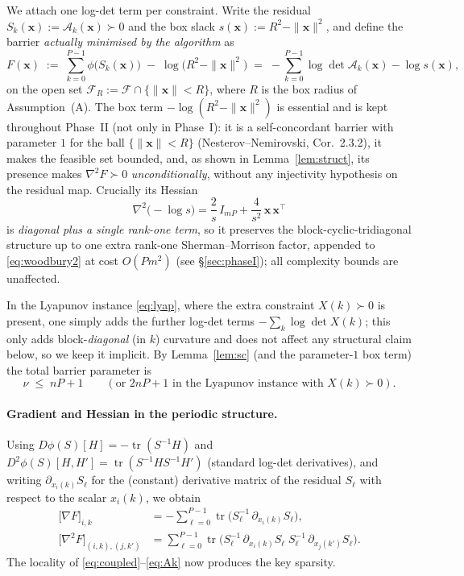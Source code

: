 \documentclass{amsart}
\newcommand{\tr}{\operatorname{tr}}
\begin{document}
We attach one log-det term per constraint. Write the residual
$S_k(\bm x):=\mathcal A_k(\bm x)\succ0$ and the box slack
$s(\bm x):=R^2-\|\bm x\|^2$, and define the barrier \emph{actually minimised by the
algorithm} as
\begin{equation}\label{eq:barrier}
  F(\bm x)\;:=\;\sum_{k=0}^{P-1} \phi\big(S_k(\bm x)\big)\;-\;\log\!\big(R^2-\|\bm x\|^2\big)
            \;=\;-\sum_{k=0}^{P-1}\log\det\mathcal A_k(\bm x)-\log s(\bm x),
\end{equation}
on the open set $\mathcal F_R:=\mathcal F\cap\{\|\bm x\|<R\}$, where $R$ is the box
radius of Assumption~(A). The box term $-\log(R^2-\|\bm x\|^2)$ is essential and is
kept throughout Phase~II (not only in Phase~I): it is a self-concordant barrier with
parameter $1$ for the ball $\{\|\bm x\|<R\}$ (Nesterov--Nemirovski, Cor.~2.3.2), it
makes the feasible set bounded, and, as shown in Lemma~\ref{lem:struct}, its presence
makes $\nabla^2F\succ0$ \emph{unconditionally}, without any injectivity hypothesis on
the residual map. Crucially its Hessian
\begin{equation}\label{eq:boxhess}
  \nabla^2\!\big(-\log s\big)=\frac{2}{s}\,I_{mP}+\frac{4}{s^2}\,\bm x\,\bm x^{\!\top}
\end{equation}
is \emph{diagonal plus a single rank-one term}, so it preserves the
block-cyclic-tridiagonal structure up to one extra rank-one Sherman--Morrison factor,
appended to \eqref{eq:woodbury2} at cost $O(Pm^2)$ (see \S\ref{sec:phaseI}); all
complexity bounds are unaffected.

In the Lyapunov instance \eqref{eq:lyap}, where the extra constraint $X(k)\succ0$ is
present, one simply adds the further log-det terms $-\sum_k\log\det X(k)$; this only
adds block-\emph{diagonal} (in $k$) curvature and does not affect any structural
claim below, so we keep it implicit. By Lemma~\ref{lem:sc} (and the parameter-$1$ box
term) the total barrier parameter is
\begin{equation}\label{eq:nu}
  \nu\;\le\;nP+1\qquad(\text{or }2nP+1\text{ in the Lyapunov instance with }X(k)\succ0).
\end{equation}

\paragraph{Gradient and Hessian in the periodic structure.}
Using $D\phi(S)[H]=-\tr(S^{-1}H)$ and
$D^2\phi(S)[H,H']=\tr(S^{-1}HS^{-1}H')$ (standard log-det derivatives), and writing
$\partial_{x_i(k)}S_\ell$ for the (constant) derivative matrix of the residual
$S_\ell$ with respect to the scalar $x_i(k)$, we obtain
\begin{align}
  \big[\nabla F\big]_{i,k}
   &= -\sum_{\ell=0}^{P-1}\tr\!\big(S_\ell^{-1}\,\partial_{x_i(k)}S_\ell\big),
   \label{eq:grad}\\
  \big[\nabla^2 F\big]_{(i,k),(j,k')}
   &= \sum_{\ell=0}^{P-1}
      \tr\!\big(S_\ell^{-1}\,\partial_{x_i(k)}S_\ell\;
                S_\ell^{-1}\,\partial_{x_j(k')}S_\ell\big).
   \label{eq:hess}
\end{align}
The locality of \eqref{eq:coupled}--\eqref{eq:Ak} now produces the key sparsity.
\end{document}
